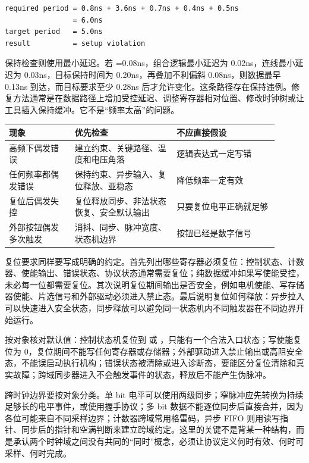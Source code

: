 \begin{lstlisting}
required period = 0.8ns + 3.6ns + 0.7ns + 0.4ns + 0.5ns
                = 6.0ns
target period   = 5.0ns
result          = setup violation
\end{lstlisting}

保持检查则使用最小延迟。若 =0.08ns，组合逻辑最小延迟为 0.02ns，连线最小延迟为 0.03ns，目标保持时间为 0.20ns，再叠加不利偏斜 0.08ns，则数据最早 0.13ns 到达，而目标要求至少 0.28ns 后才允许变化。这条路径存在保持违例。修复方法通常是在数据路径上增加受控延迟、调整寄存器相对位置、修改时钟树或让工具插入保持缓冲。它不是“频率太高”的问题。

\begin{longtable}{L{0.22\linewidth}L{0.34\linewidth}L{0.34\linewidth}}
\toprule
现象 & 优先检查 & 不应直接假设 \\
\midrule
高频下偶发错误 & 建立约束、关键路径、温度和电压角落 & 逻辑表达式一定写错 \\\tablerowrule
任何频率都偶发错误 & 保持约束、异步输入、复位释放、亚稳态 & 降低频率一定有效 \\\tablerowrule
复位后偶发失控 & 复位释放同步、非法状态恢复、安全默认输出 & 只要复位电平正确就足够 \\\tablerowrule
外部按钮偶发多次触发 & 消抖、同步、脉冲宽度、状态机边界 & 按钮已经是数字信号 \\
\bottomrule
\end{longtable}

复位要求同样要写成明确的约定。首先列出哪些寄存器必须复位：控制状态、计数器、使能输出、错误状态、协议状态通常需要复位；纯数据缓冲如果写使能受控，未必每一位都需要复位。其次说明复位期间输出是否安全，例如电机使能、写存储器使能、片选信号和外部驱动必须进入禁止态。最后说明复位如何释放：异步拉入可以快速进入安全状态，同步释放可以避免同一状态机内不同触发器在不同边界开始运行。

按对象核对默认值：控制状态机复位到  或 ，只能有一个合法入口状态；写使能复位为 0，复位期间不能写任何寄存器或存储器；外部驱动进入禁止输出或高阻安全态，不能误启动执行机构；错误状态被清除或进入诊断态，要能区分复位清除和真实故障；跨域同步器进入不会触发事件的状态，释放后不能产生伪脉冲。

跨时钟边界要按对象分类。单 bit 电平可以使用两级同步；窄脉冲应先转换为持续足够长的电平事件，或使用握手协议；多 bit 数据不能逐位同步后直接合并，因为各位可能来自不同采样边界；计数器跨域常用格雷码，异步 FIFO 则用读写指针、同步后的指针和空满判断来建立跨域约定。这里的关键不是背某一种结构，而是承认两个时钟域之间没有共同的“同时”概念，必须让协议定义何时有效、何时可采样、何时完成。

